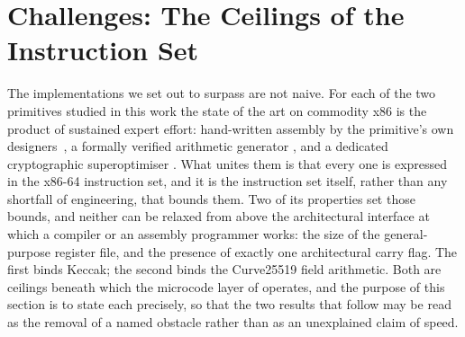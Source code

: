 %
%

\section{Challenges: The Ceilings of the Instruction Set}
\label{sec:challenges}

The implementations we set out to surpass are not naive. For each of the two
primitives studied in this work the state of the art on commodity x86 is the
product of sustained expert effort: hand-written assembly by the primitive's own
designers~\cite{PKC:Bernstein06,bernsteinHighSpeedHighSecurity2012}, a formally
verified arithmetic generator \cite{erbsenSimpleHighLevel2019}, and a dedicated
cryptographic superoptimiser \cite{kuepperCryptOpt2023}. What unites them is that every one is expressed in
the x86-64 instruction set, and it is the instruction set itself, rather than any
shortfall of engineering, that bounds them. Two of its properties set those
bounds, and neither can be relaxed from above the architectural interface at
which a compiler or an assembly programmer works: the size of the
general-purpose register file, and the presence of exactly one architectural
carry flag. The first binds Keccak; the second binds the Curve25519 field
arithmetic. Both are ceilings beneath which the microcode layer of
 operates, and the purpose of this section is to state each
precisely, so that the two results that follow may be read as the removal of a
named obstacle rather than as an unexplained claim of speed.


